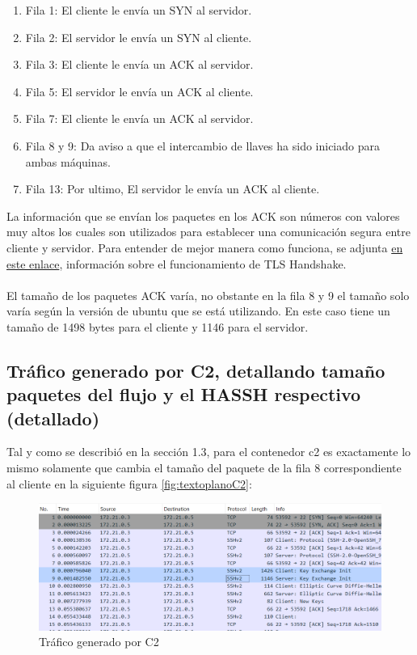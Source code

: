 \documentclass[letter,12pt]{article}
\begin{document}
\begin{enumerate}
    \item Fila 1: El cliente le envía un SYN al servidor.
    
    \item Fila 2: El servidor le envía un SYN al cliente.

    \item Fila 3: El cliente le envía un ACK al servidor.

    \item Fila 5: El servidor le envía un ACK al cliente.

    \item Fila 7: El cliente le envía un ACK al servidor.

    \item Fila 8 y 9: Da aviso a que el intercambio de llaves ha sido iniciado para ambas máquinas.

    \item Fila 13: Por ultimo, El servidor le envía un ACK al cliente.

\end{enumerate}

La información que se envían los paquetes en los ACK son números con valores muy altos los cuales son utilizados para establecer una comunicación segura entre cliente y servidor. Para entender de mejor manera como funciona, se adjunta \href{https://www.cloudflare.com/learning/ssl/what-happens-in-a-tls-handshake/}{en este enlace}, información sobre el funcionamiento de TLS Handshake.\\
\\
El tamaño de los paquetes ACK varía, no obstante en la fila 8 y 9 el tamaño solo varía según la versión de ubuntu que se está utilizando. En este caso tiene un tamaño de 1498 bytes para el cliente y 1146 para el servidor.


\subsection{Tráfico generado por C2, detallando tamaño paquetes del flujo y el HASSH respectivo (detallado)}

Tal y como se describió en la sección 1.3, para el contenedor c2 es exactamente lo mismo solamente que cambia el tamaño del paquete de la fila 8 correspondiente al cliente en la siguiente figura \ref{fig:textoplanoC2}:

\begin{figure}[ht]
    \centering
    \includegraphics[width=1\linewidth]{Images/parte1/trafico_c2.png}
    \caption{Tráfico generado por C2}
    \label{fig:trafico_c2}
\end{figure}
\end{document}
